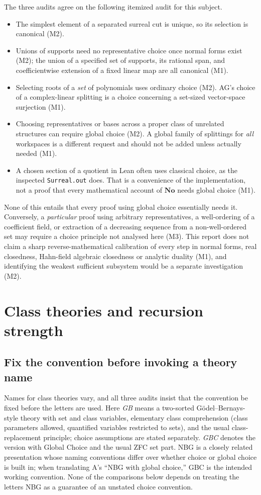 \documentclass[11pt,letterpaper]{article}
\numberwithin{equation}{section}
\theoremstyle{definition}
\theoremstyle{remark}
\newcommand{\No}{\mathbf{No}}
\begin{document}
The three audits agree on the following itemized audit for this subject.
\begin{itemize}
\item The simplest element of a separated surreal cut is unique, so its
selection is canonical (M2).
\item Unions of supports need no representative choice once normal forms exist
(M2); the union of a specified set of supports, its rational span, and
coefficientwise extension of a fixed linear map are all canonical (M1).
\item Selecting roots of a \emph{set} of polynomials uses ordinary choice (M2).
AG's choice of a complex-linear splitting is a choice concerning a set-sized
vector-space surjection (M1).
\item Choosing representatives or bases across a proper class of unrelated
structures can require global choice (M2). A global family of splittings for
\emph{all} workspaces is a different request and should not be added unless
actually needed (M1).
\item A chosen section of a quotient in Lean often uses classical choice, as
the inspected \texttt{Surreal.out} does. That is a convenience of the
implementation, not a proof that every mathematical account of $\No$ needs
global choice (M1).
\end{itemize}

None of this entails that every proof using global choice essentially needs it.
Conversely, a \emph{particular} proof using arbitrary representatives, a
well-ordering of a coefficient field, or extraction of a decreasing sequence
from a non-well-ordered set may require a choice principle not analysed here
(M3). This report does not claim a sharp reverse-mathematical calibration of
every step in normal forms, real closedness, Hahn-field algebraic closedness or
analytic duality (M1), and identifying the weakest sufficient subsystem would be
a separate investigation (M2).
\section{Class theories and recursion strength}
\label{found:sec:classes}

\subsection{Fix the convention before invoking a theory name}
\label{found:sub:gbconvention}
Names for class theories vary, and all three audits insist that the convention
be fixed before the letters are used. Here \emph{GB} means a two-sorted
G\"odel--Bernays-style theory with set and class variables, elementary class
comprehension (class parameters allowed, quantified variables restricted to
sets), and the usual class-replacement principle; choice assumptions are stated
separately. \emph{GBC} denotes the version with Global Choice and the usual ZFC
set part. NBG is a closely related presentation whose naming conventions differ
over whether choice or global choice is built in; when translating A's ``NBG
with global choice,'' GBC is the intended working convention. None of the
comparisons below depends on treating the letters NBG as a guarantee of an
unstated choice convention.
\end{document}
